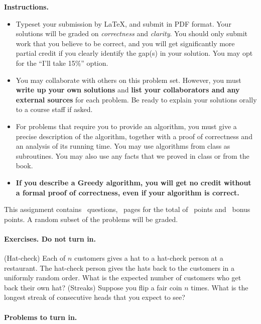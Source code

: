 \noindent \textbf{Instructions.}

\begin{itemize} 
\item Typeset your submission by \LaTeX, and submit in PDF
  format. Your solutions will be graded on \emph{correctness} and
  \emph{clarity}. You should only submit work that you believe to be
  correct, and you will get significantly more partial credit if you
  clearly identify the gap(s) in your solution. You may opt for the
  ``I’ll take 15\%'' option.
\item You may collaborate with others on this problem set.  However,
  you must \textbf{{write up your own solutions}} and \textbf{{list
      your collaborators and any external sources}} for each
  problem. Be ready to explain your solutions orally to a course staff
  if asked.
\item For problems that require you to provide an algorithm, you must
  give a precise description of the algorithm, together with a proof
  of correctness and an analysis of its running time. You may use
  algorithms from class as subroutines. You may also use any facts
  that we proved in class or from the book.
\item \textbf{If you describe a Greedy algorithm, you will get no
    credit without a formal proof of correctness, even if your
    algorithm is correct.}
\end{itemize}

\noindent This assignment contains \numquestions\ questions,
\numpages\ pages for the total of \numpoints \ points and
\numbonuspoints\ bonus points. A random subset of the problems will be
graded. \medskip

\paragraph{Exercises. Do not turn in.}
\begin{questions}
  \question (Hat-check) Each of $n$ customers gives a hat to a
  hat-check person at a restaurant. The hat-check person gives the
  hats back to the customers in a uniformly random order. What is the
  expected number of customers who get back their own hat?  \question
  (Streaks) Suppose you flip a fair coin $n$ times. What is the
  longest streak of consecutive heads that you expect to see?
\end{questions}
\newpage 
\paragraph{Problems to turn in.}

